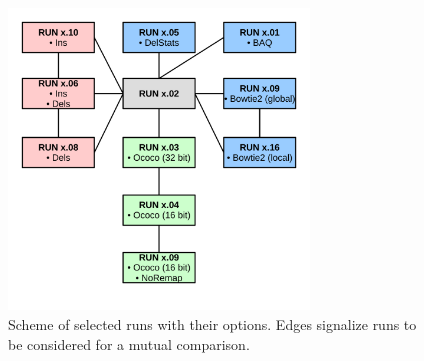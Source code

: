 \documentclass[11pt]{article}
\begin{document}
\clearpage

\begin{figure}[h!]
        \begin{center}
        \includegraphics[width=8cm]{runs_scheme.pdf}
        \end{center}

        \caption{
                Scheme of selected runs with their options. Edges signalize runs to be considered for a mutual comparison.
        }
        \label{fig:selected_runs}
\end{figure}
\end{document}
